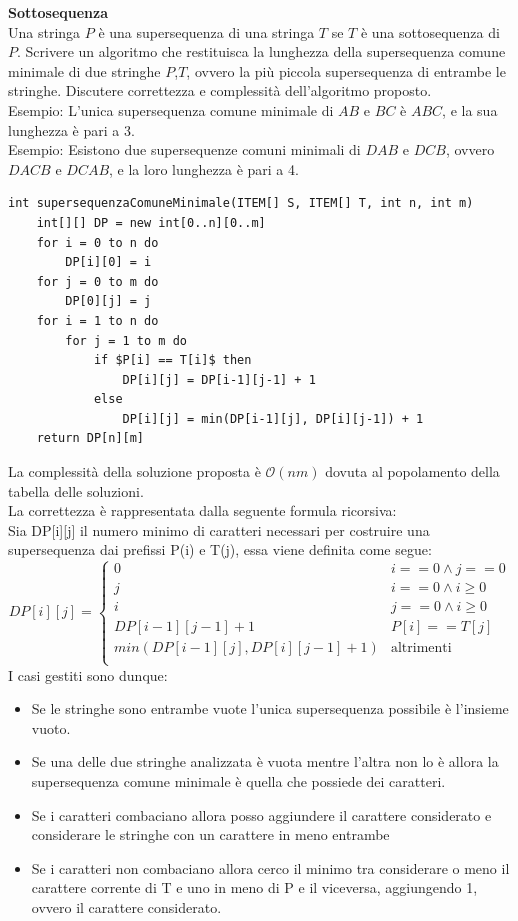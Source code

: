 \documentclass[../cheatSheetAlgoritmi.tex]{subfiles}
\begin{document}
\textbf{Sottosequenza}\\
Una stringa $P$ è una supersequenza di una stringa $T$ se $T$ è una sottosequenza di $P$. Scrivere un algoritmo che restituisca la lunghezza della supersequenza comune minimale di due stringhe $P$,$T$, ovvero la più piccola supersequenza di entrambe le stringhe. Discutere correttezza e complessità dell’algoritmo proposto.\\
Esempio: L’unica supersequenza comune minimale di $AB$ e $BC$ è $ABC$, e la sua lunghezza è pari a 3.\\
Esempio: Esistono due supersequenze comuni minimali di $DAB$ e $DCB$, ovvero $DACB$ e $DCAB$, e la loro lunghezza è pari a 4.
\begin{lstlisting}[caption=Supersequenza comune minimale]
int supersequenzaComuneMinimale(ITEM[] S, ITEM[] T, int n, int m) 
    int[][] DP = new int[0..n][0..m]
    for i = 0 to n do
        DP[i][0] = i
    for j = 0 to m do
        DP[0][j] = j
    for i = 1 to n do
        for j = 1 to m do 
            if $P[i] == T[i]$ then 
                DP[i][j] = DP[i-1][j-1] + 1
            else
                DP[i][j] = min(DP[i-1][j], DP[i][j-1]) + 1
    return DP[n][m]
\end{lstlisting}
La complessità della soluzione proposta è $\mathcal{O}(nm)$ dovuta al popolamento della tabella delle soluzioni. \\
La correttezza è rappresentata dalla seguente formula ricorsiva: \\
Sia DP[i][j] il numero minimo di caratteri necessari per costruire una supersequenza dai prefissi P(i) e T(j), essa viene definita come segue: \\
\begin{equation*}
    DP[i][j]=\begin{cases}
        0 & \text{$i == 0 \land j == 0$} \\
        j & \text{$i == 0 \land i \geq 0$} \\
        i & \text{$j == 0 \land i \geq 0$} \\
        DP[i-1][j-1] + 1 & \text{$P[i] == T[j]$} \\
        min(DP[i-1][j], DP[i][j-1] + 1) & \text{altrimenti} \\
    \end{cases}
\end{equation*}
I casi gestiti sono dunque: \\
\begin{itemize}
    \item Se le stringhe sono entrambe vuote l'unica supersequenza possibile è l'insieme vuoto.
    \item Se una delle due stringhe analizzata è vuota mentre l'altra non lo è allora la supersequenza comune minimale è quella che possiede dei caratteri. 
    \item Se i caratteri combaciano allora posso aggiundere il carattere considerato e considerare le stringhe con un carattere in meno entrambe
    \item Se i caratteri non combaciano allora cerco il minimo tra considerare o meno il carattere corrente di T e uno in meno di P e il viceversa, aggiungendo 1, ovvero il carattere considerato.
\end{itemize}
\end{document}
